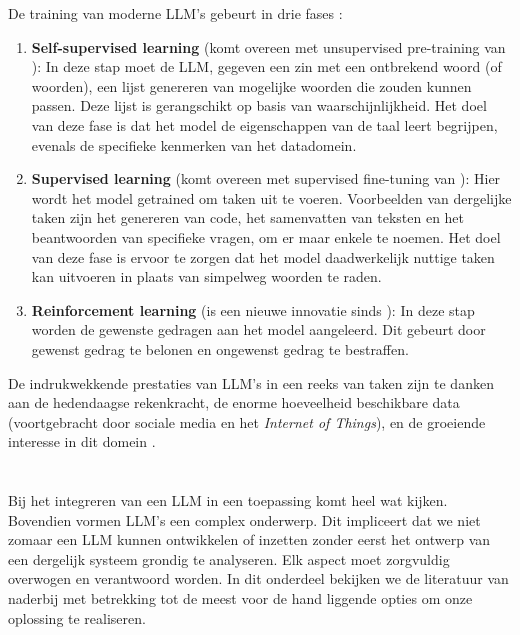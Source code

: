 De training van moderne \acrshort{LLM}'s gebeurt in drie fases \autocite{Bach2024}:
\begin{enumerate} 
    \item \textbf{Self-supervised learning} (komt overeen met unsupervised pre-training van \textcite{Radford2018}): In deze stap moet de LLM, gegeven een zin met een ontbrekend woord (of woorden), een lijst genereren van mogelijke woorden die zouden kunnen passen. Deze lijst is gerangschikt op basis van waarschijnlijkheid. Het doel van deze fase is dat het model de eigenschappen van de taal leert begrijpen, evenals de specifieke kenmerken van het datadomein.
    \item \textbf{Supervised learning} (komt overeen met supervised fine-tuning van \textcite{Radford2018}): Hier wordt het model getrained om taken uit te voeren. Voorbeelden van dergelijke taken zijn het genereren van code, het samenvatten van teksten en het beantwoorden van specifieke vragen, om er maar enkele te noemen. Het doel van deze fase is ervoor te zorgen dat het model daadwerkelijk nuttige taken kan uitvoeren in plaats van simpelweg woorden te raden.
    \item \textbf{Reinforcement learning} (is een nieuwe innovatie sinds \textcite{Radford2018}): In deze stap worden de gewenste gedragen aan het model aangeleerd. Dit gebeurt door gewenst gedrag te belonen en ongewenst gedrag te bestraffen.
\end{enumerate}

De indrukwekkende prestaties van \acrshort{LLM}'s in een reeks van taken \autocite{Naveed2023} zijn te danken aan de hedendaagse rekenkracht, de enorme hoeveelheid beschikbare data (voortgebracht door sociale media en het \emph{Internet of Things}), en de groeiende interesse in dit domein \autocite{Zohuri2022, Naveed2023}.

\section{}%
\label{sec:ontwerp}

Bij het integreren van een \acrshort{LLM} in een toepassing komt heel wat kijken. Bovendien vormen \acrshort{LLM}'s een complex onderwerp. Dit impliceert dat we niet zomaar een \acrshort{LLM} kunnen ontwikkelen of inzetten zonder eerst het ontwerp van een dergelijk systeem grondig te analyseren. Elk aspect moet zorgvuldig overwogen en verantwoord worden. In dit onderdeel bekijken we de literatuur van naderbij met betrekking tot de meest voor de hand liggende opties om onze oplossing te realiseren.

